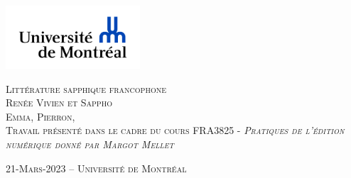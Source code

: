 \documentclass[12pt,french,letterpaper]{article}
\subtitle{Renée Vivien et Sappho}
\author{Emma    Pierron    Université de Montréal }
\date{}
\begin{document}

\begin{titlepage}%
\begin{center}
    \enlargethispage{2cm}
    
\includegraphics[width = 50mm]{logo} %

\vspace*{3cm}
\scshape\Huge Littérature sapphique francophone\\
\normalfont\Large Renée Vivien et Sappho\\
\large \vspace*{3cm}
Emma,  Pierron,  
\\
\normalsize\vspace*{1cm}Travail présenté dans le cadre du cours FRA3825 - \em Pratiques
de l'édition numérique
 \normalfont donné par Margot Mellet 

\vspace*{3cm}
\end{center}

\vspace*{\fill}
\begin{flushright}
\end{flushright}

\begin{center}
\scshape\normalsize\vspace*{1cm} 21-Mars-2023 --      Université de
Montréal 
\\
\end{center}
\end{titlepage}




\newpage 
\end{document}
